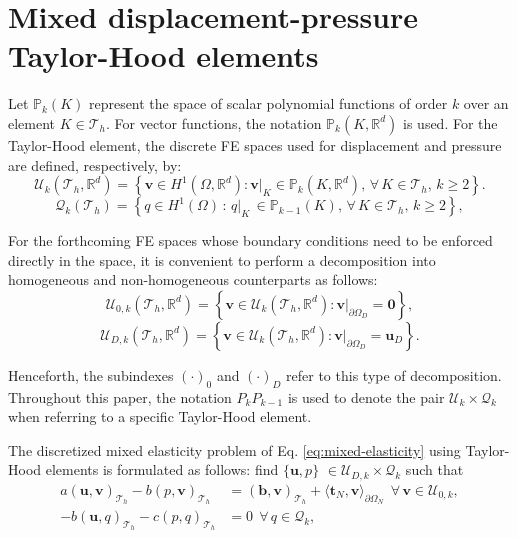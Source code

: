 \documentclass[english,11pt,3p,number,sort&compress]{elsarticle}
\begin{document}
\section{Mixed displacement-pressure Taylor-Hood elements \label{sec:taylor-hood}}

Let $\mathbb{P}_k(K)$ represent the space of scalar polynomial functions of order $k$ over an element $K\in\mathcal{T}_h$. For vector functions, the notation $\mathbb{P}_k(K,\mathbb{R}^d)$ is used. For the Taylor-Hood element, the discrete FE spaces used for displacement and pressure are defined, respectively, by:
\begin{equation}
    \label{eq:uTH}
    \mathcal{U}_k(\mathcal{T}_h,\mathbb{R}^d) = \left\{\bm{v} \in H^1(\Omega,\mathbb{R}^d) : \bm{v}\lvert_{K} \in \mathbb{P}_k(K,\mathbb{R}^d), \,\forall \,K \in \mathcal{T}_h, \, k\geq 2 \right\}.
\end{equation}
\begin{equation}
    \label{eq:qTH}
    \mathcal{Q}_k(\mathcal{T}_h) = \left\{q \in H^1(\Omega) \,:\, q\lvert_{K} \, \in \mathbb{P}_{k-1}(K), \,\forall \, K \in \mathcal{T}_h, \, k\geq 2\right\},
\end{equation}

For the forthcoming FE spaces whose boundary conditions need to be enforced directly in the space, it is convenient to perform a decomposition into homogeneous and non-homogeneous counterparts as follows:
\begin{equation}
    \label{eq:uTH0}
    \mathcal{U}_{0,k}(\mathcal{T}_h,\mathbb{R}^d)=\left\{ \bm{v} \in \mathcal{U}_k(\mathcal{T}_h,\mathbb{R}^d) : \bm{v} \lvert_{\partial\Omega_D}=\bm{0}\right\},
\end{equation}
\begin{equation}
    \label{eq:uTHD}
    \mathcal{U}_{D,k}(\mathcal{T}_h,\mathbb{R}^d)=\left\{ \bm{v} \in \mathcal{U}_k(\mathcal{T}_h,\mathbb{R}^d) : \bm{v} \lvert_{\partial\Omega_D}=\bm{u}_D\right\}.
\end{equation}

\noindent Henceforth, the subindexes $(\cdot)_0$ and $(\cdot)_D$ refer to this type of decomposition. Throughout this paper, the notation $P_k P_{k-1}$ is used to denote the pair $\mathcal{U}_k \times \mathcal{Q}_k$ when referring to a specific Taylor-Hood element.

The discretized mixed elasticity problem of Eq. \eqref{eq:mixed-elasticity} using Taylor-Hood elements is formulated as follows: find $\{\bm{u},p\}$ $\in \mathcal{U}_{D,k} \times \mathcal{Q}_k$ such that
\begin{subequations} \label{eq:TH-weak}
	\begin{align}
		a\left(\bm{u},\bm{v}\right)_{\mathcal{T}_h} - b\left( p, \bm{v}\right)_{\mathcal{T}_h} &= \left(\bm{b},\bm{v}\right)_{\mathcal{T}_h} + \langle\bm{t}_N,\bm{v}\rangle_{\partial\Omega_N} ~~\forall\, \bm{v} \in \mathcal{U}_{0,k},\label{eq:TH-weak-a}\\ 
		-b\left(\bm{u}, q\right)_{\mathcal{T}_h} - c\left(p,q \right)_{\mathcal{T}_h} &= 0 ~~\forall\, q \in \mathcal{Q}_k, \label{eq:TH-weak-b}
	\end{align}
\end{subequations}
\end{document}
